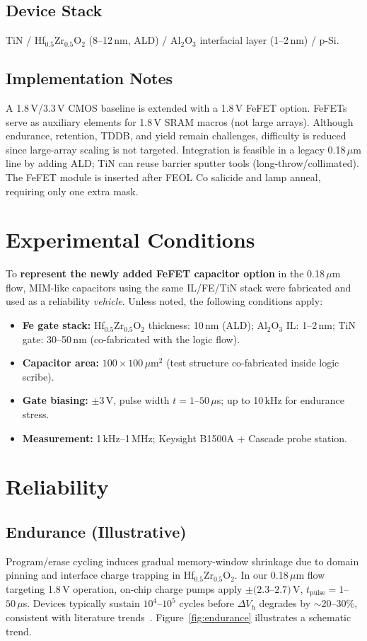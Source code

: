 \documentclass[journal]{IEEEtran}
\newcommand{\HZO}{Hf$_{0.5}$Zr$_{0.5}$O$_2$}
\begin{document}
\subsection*{Device Stack}
TiN / \HZO{} (8--12\,nm, ALD) / Al$_2$O$_3$ interfacial layer (1--2\,nm) / p-Si.

\subsection*{Implementation Notes}
A 1.8\,V/3.3\,V CMOS baseline is extended with a 1.8\,V FeFET option. FeFETs serve as auxiliary elements for 1.8\,V SRAM macros (not large arrays). Although endurance, retention, TDDB, and yield remain challenges, difficulty is reduced since large-array scaling is not targeted. Integration is feasible in a legacy 0.18\,$\mu$m line by adding ALD; TiN can reuse barrier sputter tools (long-throw/collimated). The FeFET module is inserted after FEOL Co salicide and lamp anneal, requiring only one extra mask.

\section{Experimental Conditions}
To \textbf{represent the newly added FeFET capacitor option} in the 0.18\,$\mu$m flow, MIM-like capacitors using the same IL/FE/TiN stack were fabricated and used as a reliability \emph{vehicle}. Unless noted, the following conditions apply:
\begin{itemize}
  \item \textbf{Fe gate stack:} \HZO{} thickness: 10\,nm (ALD); Al$_2$O$_3$ IL: 1--2\,nm; TiN gate: 30--50\,nm (co-fabricated with the logic flow).
  \item \textbf{Capacitor area:} $100\times100\,\mu\mathrm{m}^2$ (test structure co-fabricated inside logic scribe).
  \item \textbf{Gate biasing:} $\pm$3\,V, pulse width $t=1$--$50\,\mu$s; up to 10\,kHz for endurance stress.
  \item \textbf{Measurement:} 1\,kHz--1\,MHz; Keysight B1500A + Cascade probe station.
\end{itemize}

\section{Reliability}

\subsection*{Endurance (Illustrative)}
Program/erase cycling induces gradual memory-window shrinkage due to domain pinning and interface charge trapping in \HZO{}. In our 0.18\,$\mu$m flow targeting 1.8\,V operation, on-chip charge pumps apply $\pm(2.3$--$2.7)$\,V, $t_{\mathrm{pulse}}=1$--$50\,\mu$s. Devices typically sustain $10^4$--$10^5$ cycles before $\Delta V_h$ degrades by $\sim$20--30\%, consistent with literature trends~\cite{Mueller2015,Park2020}. Figure~\ref{fig:endurance} illustrates a schematic trend.
\end{document}
